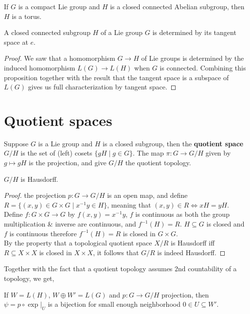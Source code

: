 \begin{example}
	If $G$ is a compact Lie group and $H$ is a closed connected Abelian subgroup, then $H$ is a torus.
\end{example}
\begin{proposition}
	A closed connected subgroup $H$ of a Lie group $G$ is determined by its tangent space at $e$.
\end{proposition}
\begin{proof}
	We saw that a homomorphism $G \to H$ of Lie groups is determined by the induced homomorphism $L(G) \to L(H)$ when $G$ is connected.
	Combining this proposition together with the result that the tangent space is a subspace of $L(G)$ gives us full characterization by tangent space.
\end{proof}

\section{Quotient spaces}
\begin{definition}
	Suppose $G$ is a Lie group and $H$ is a closed subgroup, then the \textbf{quotient space} $G / H$ is the set of (left) cosets $\{ g H \mid g \in G \}$.
	The map $\pi : G \to G / H$ given by $g \mapsto g H$ is the projection, and give $G / H$ the quotient topology.
\end{definition}
\begin{proposition}
	$G / H$ is Hausdorff.
\end{proposition}
\begin{proof}
	the projection $p : G \to G / H$ is an open map, and define $R = \{ (x, y) \in G \times G \mid x^{-1} y \in H \}$, meaning that $(x, y) \in R \iff x H = y H$.
	Define $f : G \times G \to G$ by $f(x, y) = x^{-1} y$, $f$ is continuous as both the group multiplication \& inverse are continuous, and $f^{-1}(H) = R$.
	$H \subseteq G$ is closed and $f$ is continuous therefore $f^{-1}(H) = R$ is closed in $G \times G$. \\
	By the property that a topological quotient space $X / R$ is Hausdorff iff $R \subseteq X \times X$ is closed in $X \times X$, it follows that $G / R$ is indeed Hausdorff.
\end{proof}
Together with the fact that a quotient topology assumes 2nd countability of a topology, we get,
\begin{lemma}
	If $W = L(H)$, $W \oplus W' = L(G)$ and $p : G \to G / H$ projection, then $\psi = p \circ \exp |_U$ is a bijection for small enough neighborhood $0 \in U \subseteq W'$.
\end{lemma}
